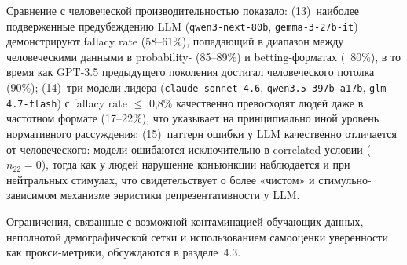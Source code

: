 Сравнение с человеческой производительностью показало: (13)~наиболее подверженные предубеждению LLM (\texttt{qwen3-next-80b}, \texttt{gemma-3-27b-it}) демонстрируют fallacy rate (58--61\%), попадающий в диапазон между человеческими данными в probability- (85--89\%) и betting-форматах (~80\%), в то время как GPT-3.5 предыдущего поколения достигал человеческого потолка (90\%); (14)~три модели-лидера (\texttt{claude-sonnet-4.6}, \texttt{qwen3.5-397b-a17b}, \texttt{glm-4.7-flash}) с fallacy rate $\leq$ 0{,}8\% качественно превосходят людей даже в частотном формате (17--22\%), что указывает на принципиально иной уровень нормативного рассуждения; (15)~паттерн ошибки у LLM качественно отличается от человеческого: модели ошибаются исключительно в correlated-условии ($n_{22} = 0$), тогда как у людей нарушение конъюнкции наблюдается и при нейтральных стимулах, что свидетельствует о более «чистом» и стимульно-зависимом механизме эвристики репрезентативности у LLM.

Ограничения, связанные с возможной контаминацией обучающих данных, неполнотой демографической сетки и использованием самооценки уверенности как прокси-метрики, обсуждаются в разделе~4.3.

